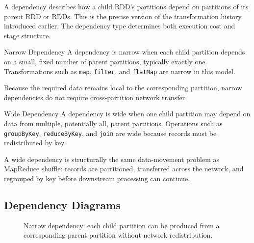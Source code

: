 \documentclass[11pt,a4paper,oneside]{book}
\begin{document}
A dependency describes how a child RDD's partitions depend on partitions of its parent RDD or RDDs. This is the precise version of the transformation history introduced earlier. The dependency type determines both execution cost and stage structure.

\begin{definitionbox}{Narrow Dependency}
A dependency is narrow when each child partition depends on a small, fixed number of parent partitions, typically exactly one. Transformations such as \texttt{map}, \texttt{filter}, and \texttt{flatMap} are narrow in this model.
\end{definitionbox}

Because the required data remains local to the corresponding partition, narrow dependencies do not require cross-partition network transfer.

\begin{definitionbox}{Wide Dependency}
A dependency is wide when one child partition may depend on data from multiple, potentially all, parent partitions. Operations such as \texttt{groupByKey}, \texttt{reduceByKey}, and \texttt{join} are wide because records must be redistributed by key.
\end{definitionbox}

A wide dependency is structurally the same data-movement problem as MapReduce shuffle: records are partitioned, transferred across the network, and regrouped by key before downstream processing can continue.

\subsection{Dependency Diagrams}

\begin{figure}[htbp]
\centering
{}
\caption{Narrow dependency: each child partition can be produced from a corresponding parent partition without network redistribution.}
\label{fig:narrow-dependency}
\end{figure}
\end{document}

